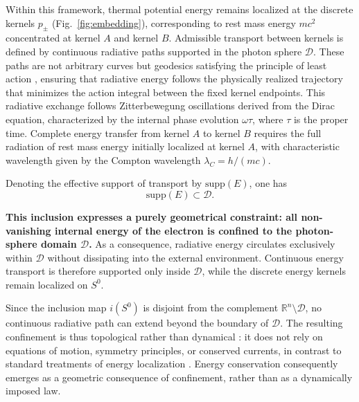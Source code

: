 \documentclass[%
 reprint,
 amsmath,amssymb,
 aps,
 prb,
]{revtex4-2}
\numberwithin{equation}{section}
\begin{document}
Within this framework, thermal potential energy remains localized at the discrete kernels $p_{\pm}$ (Fig.~\ref{fig:embedding}), corresponding to rest mass energy $mc^2$ concentrated at kernel $A$ and kernel $B$.
Admissible transport between kernels is defined by continuous radiative paths supported in the photon sphere $\mathcal{D}$.
These paths are not arbitrary curves but geodesics satisfying the principle of least action \cite{hanamura17765336}, ensuring that radiative energy follows the physically realized trajectory that minimizes the action integral between the fixed kernel endpoints.
This radiative exchange follows Zitterbewegung oscillations derived from the Dirac equation, characterized by the internal phase evolution $\omega\tau$, where $\tau$ is the proper time.
Complete energy transfer from kernel $A$ to kernel $B$ requires the full radiation of rest mass energy initially localized at kernel $A$, with characteristic wavelength given by the Compton wavelength $\lambda_C = h/(mc)$.

Denoting the effective support of transport by $\mathrm{supp}(E)$, one has
\begin{equation}
\mathrm{supp}(E) \subset \mathcal{D}.
\end{equation}

\textbf{This inclusion expresses a purely geometrical constraint: all non-vanishing internal energy of the electron is confined to the photon-sphere domain $\mathcal{D}$.}
As a consequence, radiative energy circulates exclusively within $\mathcal{D}$ without dissipating into the external environment.
Continuous energy transport is therefore supported only inside $\mathcal{D}$, while the discrete energy kernels remain localized on $S^{0}$.

Since the inclusion map $i(S^{0})$ is disjoint from the complement $\mathbb{R}^{n}\setminus \mathcal{D}$, no continuous radiative path can extend beyond the boundary of $\mathcal{D}$.
The resulting confinement is thus topological rather than dynamical \cite{Geroch1970}: it does not rely on equations of motion, symmetry principles, or conserved currents, in contrast to standard treatments of energy localization \cite{Wald1984}.
Energy conservation consequently emerges as a geometric consequence of confinement, rather than as a dynamically imposed law.
\end{document}
